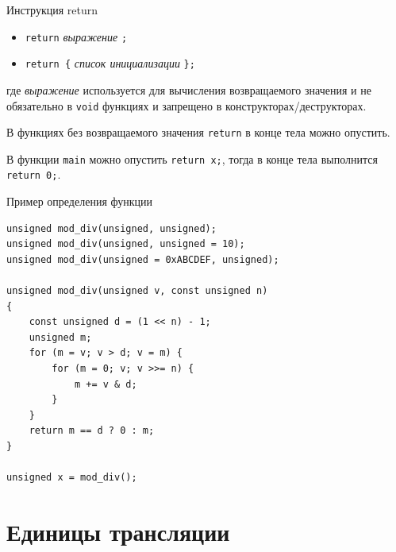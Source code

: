 \documentclass[unknownkeysallowed,xcolor=table]{beamer}
\begin{document}
\begin{frame}[fragile]{Инструкция return}

\begin{itemize}
  \item \lstinline{return} \emph{выражение} \lstinline{;}
  \item \lstinline|return {| \emph{список инициализации} \lstinline|};|
\end{itemize}

\vspace{1em}

где \emph{выражение} используется для вычисления возвращаемого значения и не обязательно в \lstinline{void} функциях и запрещено в конструкторах/деструкторах.

\vspace{1em}

В функциях без возвращаемого значения \lstinline{return} в конце тела можно опустить.

\vspace{1em}

В функции \lstinline{main} можно опустить \lstinline{return x;}, тогда в конце тела выполнится \lstinline{return 0;}.

\end{frame}

\begin{frame}[fragile]{Пример определения функции}

\begin{lstlisting}
unsigned mod_div(unsigned, unsigned);
unsigned mod_div(unsigned, unsigned = 10);
unsigned mod_div(unsigned = 0xABCDEF, unsigned);

unsigned mod_div(unsigned v, const unsigned n)
{
    const unsigned d = (1 << n) - 1;
    unsigned m;
    for (m = v; v > d; v = m) {
        for (m = 0; v; v >>= n) {
            m += v & d;
        }
    }
    return m == d ? 0 : m;
}

unsigned x = mod_div();
\end{lstlisting}

\end{frame}


\section{Единицы трансляции}
\end{document}
